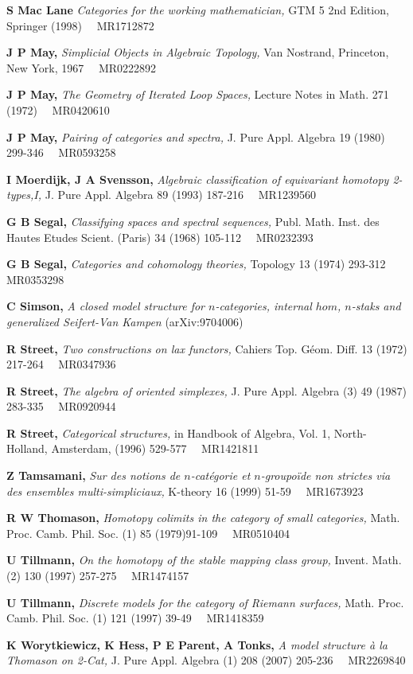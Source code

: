 \documentclass[]{amsart}
\begin{document}
\begin{thebibliography}{99}
 {\bf S Mac Lane}   \emph{Categories for the working mathematician,} GTM  5 2nd Edition,
Springer (1998) \,\,\,\, MR1712872

 {\bf J P  May,}  \emph{ Simplicial Objects in Algebraic Topology,} Van Nostrand, Princeton, New York,
1967 \,\,\,\, MR0222892

 {\bf J P May,}  \emph{ The Geometry of Iterated Loop Spaces,}  Lecture Notes in Math.  271
(1972) \,\,\,\, MR0420610

 {\bf J P May,}  \emph{ Pairing of categories and spectra,}  J.
 Pure Appl. Algebra  19 (1980) 299-346  \,\,\,\, MR0593258

 {\bf I Moerdijk, J A  Svensson,}  \emph{Algebraic classification of equivariant
homotopy 2-types,I,} J. Pure Appl. Algebra  89 (1993) 187-216 \,\,\,\, MR1239560

 {\bf G B Segal,}  \emph{Classifying spaces and spectral sequences,} Publ. Math. Inst. des
Hautes Etudes Scient. (Paris) 34 (1968) 105-112  \,\,\,\, MR0232393

 {\bf G B Segal,}  \emph{Categories and cohomology theories,} Topology  13 (1974)
293-312 \,\,\,\, MR0353298

 {\bf C Simson,}  \emph{A closed model structure for $n$-categories, internal $hom$,
 $n$-staks and generalized Seifert-Van Kampen} (arXiv:9704006)

 {\bf R Street,}  \emph{Two constructions on lax functors,}
Cahiers Top. G\'eom. Diff. 13 (1972) 217-264  \,\,\,\, MR0347936

 {\bf  R Street,}  \emph{ The algebra of oriented simplexes,}  J.  Pure Appl. Algebra
 (3) 49  (1987) 283-335  \,\,\,\, MR0920944

 {\bf R Street,}  \emph{Categorical structures,} in Handbook of Algebra, Vol. 1,
 North-Holland, Amsterdam, (1996) 529-577 \,\,\,\, MR1421811

 {\bf Z Tamsamani,}   \emph{ Sur des notions de $n$-cat\'{e}gorie et $n$-groupo\"{i}de non strictes
 via des ensembles multi-simpliciaux,} K-theory 16 (1999)  51-59 \,\,\,\, MR1673923

 {\bf R W Thomason,}  \emph{Homotopy colimits in the category of small categories,} Math. Proc. Camb. Phil. Soc. (1) 85
(1979)91-109  \,\,\,\, MR0510404

  {\bf U Tillmann,} \emph{On the homotopy of the stable mapping class group,} Invent.
Math.  (2) 130  (1997) 257-275  \,\,\,\, MR1474157

  {\bf U Tillmann,} \emph{ Discrete models for the category of Riemann surfaces,} Math. Proc. Camb.
Phil. Soc. (1) 121  (1997) 39-49  \,\,\,\, MR1418359

 {\bf K Worytkiewicz, K Hess, P E  Parent, A Tonks,}  \emph{ A model structure \`{a} la Thomason on 2-Cat,}
 J.  Pure Appl. Algebra  (1) 208 (2007) 205-236  \,\,\,\, MR2269840

\end{thebibliography}
\end{document}
